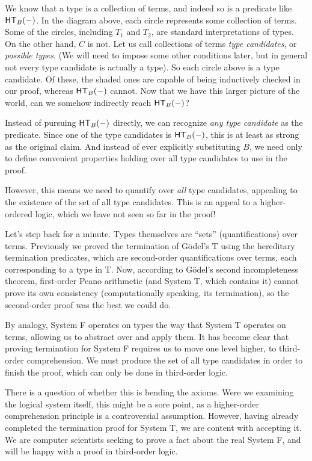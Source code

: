 \documentclass{article}
\begin{document}
We know that a type is a collection of terms, and indeed so is a predicate like
$\mathsf{HT}_{B}(-)$. In the diagram above, each circle represents some collection of terms.
Some of the circles, including $T_1$ and $T_2$, are standard interpretations of types.
On the other hand, $C$ is not. Let us call collections of terms \emph{type candidates}, or
\emph{possible types}. (We will need
to impose some other conditions later, but in general not every type candidate is actually a type).
So each circle above is a type candidate. Of these, the shaded ones are capable of being inductively
checked in our proof, whereas $\mathsf{HT}_{B}(-)$ cannot. Now that we have this larger picture of the
world, can we somehow indirectly reach $\mathsf{HT}_{B}(-)$?

Instead of pursuing $\mathsf{HT}_{B}(-)$ directly, we can recognize \emph{any type candidate}
as the predicate. Since one of the type candidates is $\mathsf{HT}_{B}(-)$, this is at
least as strong as the original claim. And instead of ever explicitly substituting $B$, we need only
to define convenient properties holding over all type candidates to use in the proof.

However, this means we need to quantify over \emph{all} type candidates, appealing to the existence
of the set of all type candidates. This is an appeal to a higher-ordered logic, which we have not
seen so far in the proof!

Let's step back for a minute. Types themselves are ``sets'' (quantifications) over terms.
Previously we proved the termination of G\"odel's T using the hereditary termination predicates,
which are second-order quantifications over terms, each corresponding to a type in T.
Now, according to G\"odel's second incompleteness theorem, first-order Peano
arithmetic (and System T, which contains it) cannot prove its own consistency (computationally
speaking, its termination), so the second-order proof was the best we could do.

By analogy, System F operates on types the way that System T operates on terms, allowing us to
abstract over and apply them. It has become clear that proving termination for System F requires us
to move one level higher, to third-order comprehension.
We must produce the set of all type candidates in order to finish the proof, which can only be
done in third-order logic.

There is a question of whether this is bending the axioms. Were we examining the
logical system itself, this might be a sore point, as a higher-order comprehension principle is
a controversial assumption. However, having already completed the termination proof for System T,
we are content with accepting it. We are computer scientists seeking to prove a fact about the real
System F, and will be happy with a proof in third-order logic.
\end{document}
